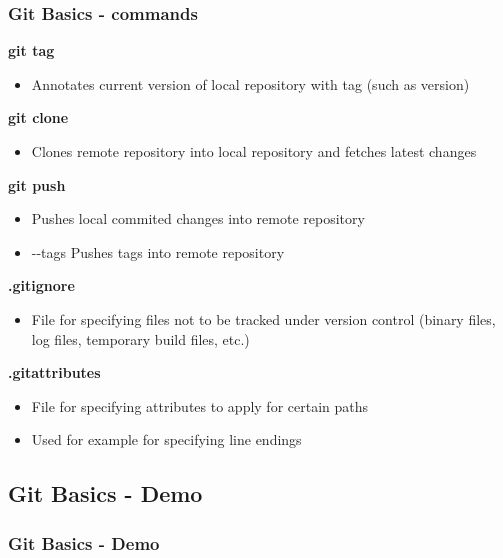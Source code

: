 \begin{frame}
\frametitle{Git Basics - commands}
\textbf{git tag}
	\begin{itemize}
	\item Annotates current version of local repository with tag (such as version)
	\end{itemize}
\textbf{git clone}
	\begin{itemize}
	\item Clones remote repository into local repository and fetches latest changes
	\end{itemize}
\textbf{git push}
	\begin{itemize}
	\item Pushes local commited changes into remote repository
	\item -{}-tags Pushes tags into remote repository
	\end{itemize}
\textbf{.gitignore}
	\begin{itemize}
	\item File for specifying files not to be tracked under version control (binary files, log files, temporary build files, etc.)
	\end{itemize}
\textbf{.gitattributes}
	\begin{itemize}
	\item File for specifying attributes to apply for certain paths
	\item Used for example for specifying line endings
	\end{itemize}
\end{frame}




\subsection[]{Git Basics - Demo}
\begin{frame}
\frametitle{Git Basics - Demo}
\end{frame}





